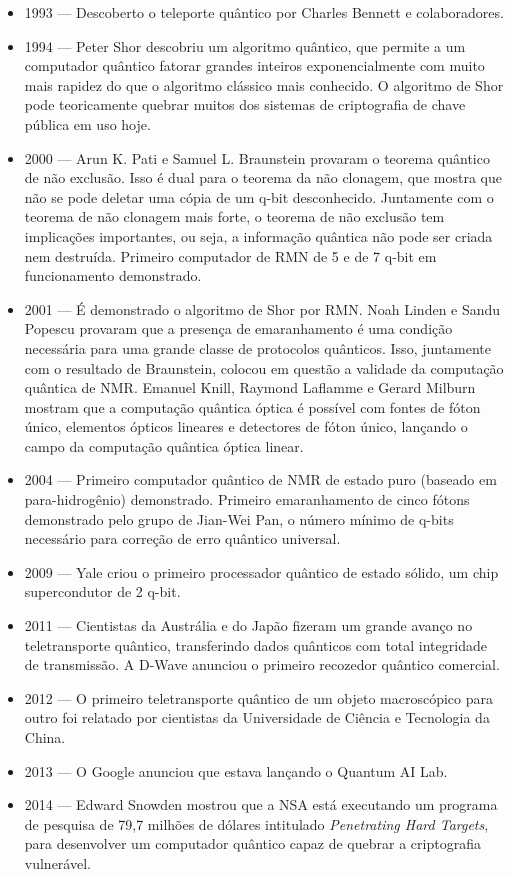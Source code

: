 \documentclass[12pt, a4paper, oneside]{article}
\begin{document}
\begin{itemize}
\item 1993 — Descoberto o teleporte quântico por Charles Bennett e colaboradores. 
\item 1994 — Peter Shor descobriu um algoritmo quântico, que permite a um computador quântico fatorar grandes inteiros exponencialmente com muito mais rapidez do que o algoritmo clássico mais conhecido. O algoritmo de Shor pode teoricamente quebrar muitos dos sistemas de criptografia de chave pública em uso hoje.
\item 2000 — Arun K. Pati e Samuel L. Braunstein provaram o teorema quântico de não exclusão. Isso é dual para o teorema da não clonagem, que mostra que não se pode deletar uma cópia de um q-bit desconhecido. Juntamente com o teorema de não clonagem mais forte, o teorema de não exclusão tem implicações importantes, ou seja, a informação quântica não pode ser criada nem destruída. Primeiro computador de RMN de 5 e de 7 q-bit em funcionamento demonstrado. 
\item 2001 — É demonstrado o algoritmo de Shor por RMN. Noah Linden e Sandu Popescu provaram que a presença de emaranhamento é uma condição necessária para uma grande classe de protocolos quânticos. Isso, juntamente com o resultado de Braunstein, colocou em questão a validade da computação quântica de NMR. Emanuel Knill, Raymond Laflamme e Gerard Milburn mostram que a computação quântica óptica é possível com fontes de fóton único, elementos ópticos lineares e detectores de fóton único, lançando o campo da computação quântica óptica linear.
\item 2004 — Primeiro computador quântico de NMR de estado puro (baseado em para-hidrogênio) demonstrado. Primeiro emaranhamento de cinco fótons demonstrado pelo grupo de Jian-Wei Pan, o número mínimo de q-bits necessário para correção de erro quântico universal. 
\item 2009 — Yale criou o primeiro processador quântico de estado sólido, um chip supercondutor de 2 q-bit.
\item 2011 — Cientistas da Austrália e do Japão fizeram um grande avanço no teletransporte quântico, transferindo dados quânticos com total integridade de transmissão. A D-Wave anunciou o primeiro recozedor quântico comercial.
\item 2012 — O primeiro teletransporte quântico de um objeto macroscópico para outro foi relatado por cientistas da Universidade de Ciência e Tecnologia da China.
\item 2013 — O Google anunciou que estava lançando o Quantum AI Lab.
\item 2014 — Edward Snowden mostrou que a NSA está executando um programa de pesquisa de 79,7 milhões de dólares intitulado \textit{Penetrating Hard Targets}, para desenvolver um computador quântico capaz de quebrar a criptografia vulnerável.

\end{itemize}
\end{document}
